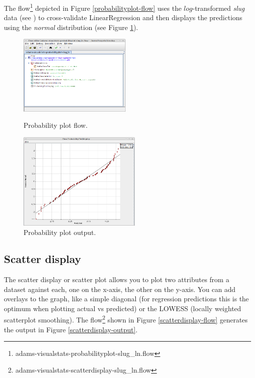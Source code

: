 \documentclass[a4paper]{book}
\begin{document}
The flow\footnote{adams-visualstats-probabilityplot-slug\_ln.flow} depicted
in Figure \ref{probabilityplot-flow} uses the $log$-transformed \textit{slug} data 
(see \cite{slug}) to cross-validate LinearRegression and then displays the
predictions using the \textit{normal} distribution (see Figure \ref{probabilityplot-output}).

\begin{figure}[ht]
  \begin{minipage}[t]{0.5\linewidth}
    \centering
    \includegraphics[width=5.5cm]{images/probabilityplot-flow.png}
    \caption{Probability plot flow.}
    \label{probabilityplot-flow}
  \end{minipage}
  \hspace{0.5cm}
  \begin{minipage}[t]{0.5\linewidth}
    \centering
    \includegraphics[width=6.0cm]{images/probabilityplot-output.png}
    \caption{Probability plot output.}
    \label{probabilityplot-output}
  \end{minipage}
\end{figure}

\clearpage
\subsection{Scatter display}
The scatter display or scatter plot allows you to plot two attributes from a 
dataset against each, one on the x-axis, the other on the y-axis. You can add
overlays to the graph, like a simple diagonal (for regression predictions this is the 
optimum when plotting actual vs predicted) or the LOWESS (locally weighted 
scatterplot smoothing). The flow\footnote{adams-visualstats-scatterdisplay-slug\_ln.flow}
shown in Figure \ref{scatterdisplay-flow} generates the output in Figure 
\ref{scatterdisplay-output}.
\end{document}

